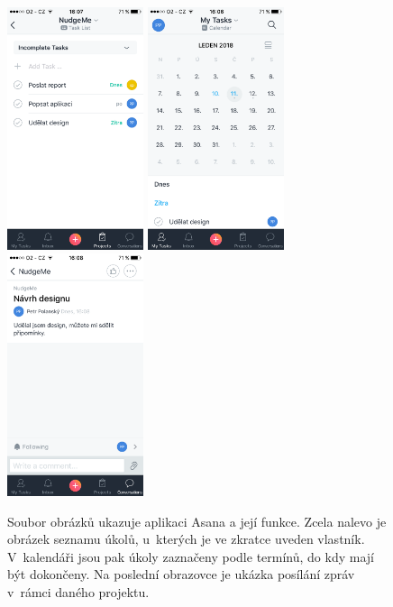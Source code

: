 \begin{figure}[H]
\centering
\includegraphics[width= 4cm]{obrazky-figures/IMG_0341}
\includegraphics[width= 4cm]{obrazky-figures/IMG_0340}
\includegraphics[width= 4cm]{obrazky-figures/IMG_0342}
\caption{Soubor obrázků ukazuje aplikaci Asana a její funkce. Zcela nalevo je obrázek seznamu úkolů, u~kterých je ve zkratce uveden vlastník. V~kalendáři jsou pak úkoly zaznačeny podle termínů, do kdy mají být dokončeny. Na poslední obrazovce je ukázka posílání zpráv v~rámci daného projektu.}
\label{asana}
\end{figure}

